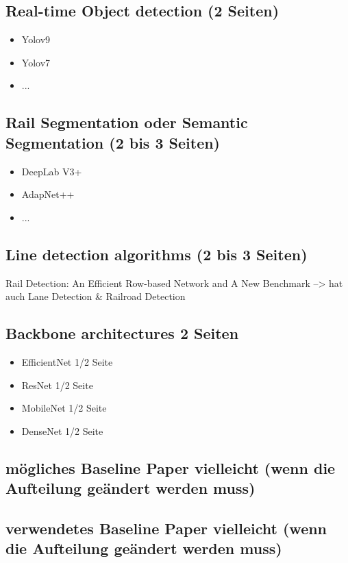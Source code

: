 \subsection{Real-time Object detection (2 Seiten)}

\begin{itemize}
    \item Yolov9
    \item Yolov7
    \item ...
\end{itemize}

\subsection{Rail Segmentation oder Semantic Segmentation (2 bis 3 Seiten)}

\begin{itemize}
    \item DeepLab V3+
    \item AdapNet++
    \item ...
\end{itemize}

\subsection{Line detection algorithms (2 bis 3 Seiten)}

Rail Detection: An Efficient Row-based Network and A New Benchmark --> hat auch Lane Detection \& Railroad Detection

\subsection{Backbone architectures 2 Seiten}

\begin{itemize}
    \item EfficientNet 1/2 Seite
    \item ResNet 1/2 Seite
    \item MobileNet 1/2 Seite
    \item DenseNet 1/2 Seite
\end{itemize}

\subsection{mögliches Baseline Paper vielleicht (wenn die Aufteilung geändert werden muss)}

\subsection{verwendetes Baseline Paper vielleicht (wenn die Aufteilung geändert werden muss)}

